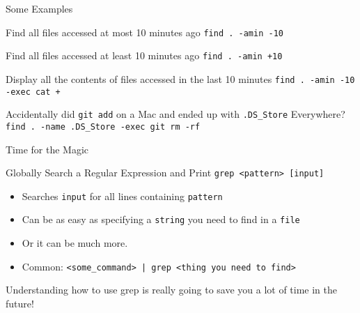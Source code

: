 \documentclass[11pt]{beamer}
\newcommand{\colbf}[1]{\textcolor{mLightBrown!77!black}{#1}}%
\def\wl{\par \vspace{\baselineskip}}                        %
\begin{document}
\begin{frame}[fragile]{Some Examples}
  \begin{block}{Find all files accessed at most 10 minutes ago}
    \texttt{find . -amin -10}
  \end{block}
  \begin{block}{Find all files accessed at least 10 minutes ago}
    \texttt{find . -amin +10}
  \end{block}
  \begin{block}{Display all the contents of files accessed in the last 10 minutes}
    \texttt{find . -amin -10 -exec cat {} +}
  \end{block}
  \begin{block}{Accidentally did \texttt{git add} on a Mac and ended up with \texttt{.DS\_Store} Everywhere? }
    \texttt{find . -name .DS\_Store -exec git rm -rf {} \;}
  \end{block}
\end{frame}

\begin{frame}[fragile]{Time for the Magic}
  \begin{block}{\colbf{G}lobally Search a \colbf{R}egular \colbf{E}xpression and \colbf{P}rint}
    \texttt{grep <pattern> [input]}
    \begin{itemize}
      \item Searches \texttt{input} for all lines containing \texttt{pattern}
      \item Can be as easy as specifying a \texttt{string} you need to find in a \texttt{file}
      \item Or it can be much more.
      \item Common: \texttt{<some\_command> | grep <thing you need to find>}
    \end{itemize}
  \end{block}\wl

  Understanding how to use grep is really going to save you a lot of time in the future!
\end{frame}
\end{document}
